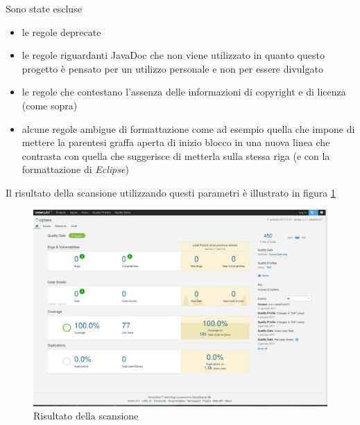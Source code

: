 		Sono state escluse 
		\begin{itemize}
			\item le regole deprecate
			\item le regole riguardanti JavaDoc che non viene utilizzato in quanto questo progetto è pensato per un utilizzo personale e non per essere divulgato
			\item le regole che contestano l'assenza delle informazioni di copyright e di licenza (come sopra)
			\item alcune regole ambigue di formattazione come ad esempio quella che impone di mettere la parentesi graffa aperta di inizio blocco in una nuova linea che contrasta con quella che suggerisce di metterla sulla stessa riga (e con la formattazione di \emph{Eclipse})
		\end{itemize}
		
		Il risultato della scansione utilizzando questi parametri è illustrato in figura \ref{fig:sonaresult}
		
		\begin{figure}[h]
			\centering
			\includegraphics[scale=0.3]{img/sonaresult}
			\caption{Risultato della scansione}
			\label{fig:sonaresult}
		\end{figure}
		